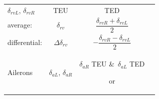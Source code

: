 \documentclass[
]{book}
\begin{document}
\begin{longtable}[]{@{}lccc@{}}
\begin{minipage}[t]{0.14\columnwidth}
\(\delta_{rvL}\),
\(\delta_{rvR}\)\strut
\end{minipage} & \begin{minipage}[t]{0.29\columnwidth}\centering
TEU\strut
\end{minipage} & \begin{minipage}[t]{0.27\columnwidth}\centering
TED\strut
\end{minipage}\tabularnewline
\begin{minipage}[t]{0.19\columnwidth}\raggedright
average:\strut
\end{minipage} & \begin{minipage}[t]{0.14\columnwidth}\centering
\(\delta_{rv}\)\strut
\end{minipage} & \begin{minipage}[t]{0.29\columnwidth}\centering
\[\frac{\delta_{rvR}+\delta_{rvL}}{2}\]\strut
\end{minipage} & \begin{minipage}[t]{0.27\columnwidth}\centering
\strut
\end{minipage}\tabularnewline
\begin{minipage}[t]{0.19\columnwidth}\raggedright
differential:\strut
\end{minipage} & \begin{minipage}[t]{0.14\columnwidth}\centering
\(\Delta\delta_{rv}\)\strut
\end{minipage} & \begin{minipage}[t]{0.29\columnwidth}\centering
\[-\frac{\delta_{rvR} - \delta_{rvL}}{2}\]\strut
\end{minipage} & \begin{minipage}[t]{0.27\columnwidth}\centering
\strut
\end{minipage}\tabularnewline
\begin{minipage}[t]{0.19\columnwidth}\raggedright
Ailerons\strut
\end{minipage} & \begin{minipage}[t]{0.14\columnwidth}\centering
\(\delta_{aL}\),
\(\delta_{aR}\)\strut
\end{minipage} & \begin{minipage}[t]{0.29\columnwidth}\centering
\(\delta_{aR}\) TEU \&~\(\delta_{aL}\) TED

or


\end{minipage}
\end{longtable}
\end{document}

